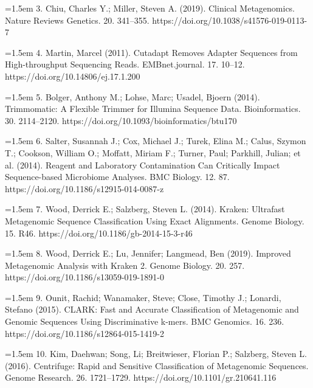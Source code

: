 \documentclass[11pt]{article}
\begin{document}
\hangindent=1.5em  3. Chiu, Charles Y.; Miller, Steven A. (2019). Clinical Metagenomics. Nature Reviews Genetics. 20. 341--355. https://doi.org/10.1038/s41576-019-0113-7\par

\hangindent=1.5em  4. Martin, Marcel (2011). Cutadapt Removes Adapter Sequences from High-throughput Sequencing Reads. EMBnet.journal. 17. 10--12. https://doi.org/10.14806/ej.17.1.200\par

\hangindent=1.5em  5. Bolger, Anthony M.; Lohse, Marc; Usadel, Bjoern (2014). Trimmomatic: A Flexible Trimmer for Illumina Sequence Data. Bioinformatics. 30. 2114--2120. https://doi.org/10.1093/bioinformatics/btu170\par

\hangindent=1.5em  6. Salter, Susannah J.; Cox, Michael J.; Turek, Elina M.; Calus, Szymon T.; Cookson, William O.; Moffatt, Miriam F.; Turner, Paul; Parkhill, Julian; et al. (2014). Reagent and Laboratory Contamination Can Critically Impact Sequence-based Microbiome Analyses. BMC Biology. 12. 87. https://doi.org/10.1186/s12915-014-0087-z\par

\hangindent=1.5em  7. Wood, Derrick E.; Salzberg, Steven L. (2014). Kraken: Ultrafast Metagenomic Sequence Classification Using Exact Alignments. Genome Biology. 15. R46. https://doi.org/10.1186/gb-2014-15-3-r46\par

\hangindent=1.5em  8. Wood, Derrick E.; Lu, Jennifer; Langmead, Ben (2019). Improved Metagenomic Analysis with Kraken 2. Genome Biology. 20. 257. https://doi.org/10.1186/s13059-019-1891-0\par

\hangindent=1.5em  9. Ounit, Rachid; Wanamaker, Steve; Close, Timothy J.; Lonardi, Stefano (2015). CLARK: Fast and Accurate Classification of Metagenomic and Genomic Sequences Using Discriminative k-mers. BMC Genomics. 16. 236. https://doi.org/10.1186/s12864-015-1419-2\par

\hangindent=1.5em  10. Kim, Daehwan; Song, Li; Breitwieser, Florian P.; Salzberg, Steven L. (2016). Centrifuge: Rapid and Sensitive Classification of Metagenomic Sequences. Genome Research. 26. 1721--1729. https://doi.org/10.1101/gr.210641.116\par
\end{document}
